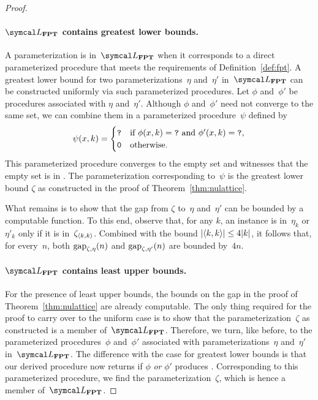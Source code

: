 \begin{proof}
  \paragraph{$\calL_\cl{FPT}$ contains greatest lower bounds.}
  A parameterization is in~$\calL_\cl{FPT}$ when it corresponds to a direct parameterized procedure that meets the requirements of Definition~\ref{def:fpt}.
  A greatest lower bound for two parameterizations~$\eta$ and~$\eta'$ in~$\calL_\cl{FPT}$ can be constructed uniformly via such parameterized procedures.
  Let $\phi$ and~$\phi'$ be procedures associated with $\eta$ and~$\eta'$.
  Although $\phi$ and~$\phi'$ need not converge to the same set, we can combine them in a parameterized procedure~$\psi$ defined by
  \begin{equation*}
    \psi(x, k) = \begin{cases}
      \textnormal{\texttt{?}}	&\text{if $\phi(x, k) = \textnormal{\texttt{?}}$ and $\phi'(x, k) = \textnormal{\texttt{?}}$}, \\
      \textnormal{\texttt{0}}	&\text{otherwise}.
    \end{cases}
  \end{equation*}
  This parameterized procedure converges to the empty set and witnesses that the empty set is in .
  The parameterization corresponding to~$\psi$ is the greatest lower bound $\zeta$ as constructed in the proof of Theorem~\ref{thm:nulattice}.

  What remains is to show that the gap from $\zeta$ to~$\eta$ and~$\eta'$ can be bounded by a computable function.
  To this end, observe that, for any $k$, an instance is in~$\eta_k$ or~$\eta'_k$ only if it is in~$\zeta_{{\langle k, k\rangle}}$.
  Combined with the bound ${\lvert{\langle k, k\rangle}\rvert} \le 4{\lvert k\rvert}$, it follows that, for every~$n$, both $\operatorname{gap}_{\zeta, \eta}(n)$ and $\operatorname{gap}_{\zeta, \eta'}(n)$ are bounded by~$4n$.

  \paragraph{$\calL_\cl{FPT}$ contains least upper bounds.}
  For the presence of least upper bounds, the bounds on the gap in the proof of Theorem~\ref{thm:nulattice} are already computable.
  The only thing required for the proof to carry over to the uniform case is to show that the parameterization~$\zeta$ as constructed is a member of~$\calL_\cl{FPT}$.
  Therefore, we turn, like before, to the parameterized procedures~$\phi$ and~$\phi'$ associated with parameterizations~$\eta$ and~$\eta'$ in~$\calL_\cl{FPT}$.
  The difference with the case for greatest lower bounds is that our derived  procedure now returns  if $\phi$ \emph{or} $\phi'$ produces .
  Corresponding to this parameterized procedure, we find the parameterization~$\zeta$, which is hence a member of~$\calL_\cl{FPT}$.


\end{proof}
